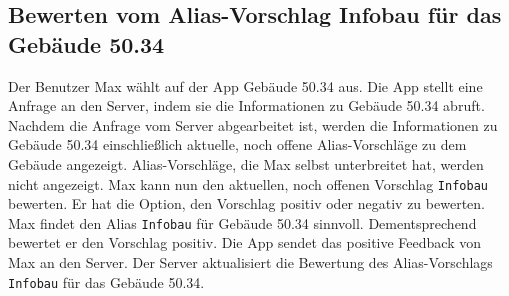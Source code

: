\subsection{Bewerten vom Alias-Vorschlag Infobau für das Gebäude 50.34}

Der Benutzer Max wählt auf der App Gebäude 50.34 aus.
Die App stellt eine Anfrage an den Server, indem sie die Informationen zu Gebäude 50.34 abruft. 
Nachdem die Anfrage vom Server abgearbeitet ist, werden die Informationen zu Gebäude 50.34 einschließlich aktuelle, noch offene Alias-Vorschläge zu dem Gebäude angezeigt.
Alias-Vorschläge, die Max selbst unterbreitet hat, werden nicht angezeigt.
Max kann nun den aktuellen, noch offenen Vorschlag \texttt{Infobau} bewerten.
Er hat die Option, den Vorschlag positiv oder negativ zu bewerten.
Max findet den Alias \texttt{Infobau} für Gebäude 50.34 sinnvoll.
Dementsprechend bewertet er den Vorschlag positiv.
Die App sendet das positive Feedback von Max an den Server.
Der Server aktualisiert die Bewertung des Alias-Vorschlags \texttt{Infobau} für das Gebäude 50.34.